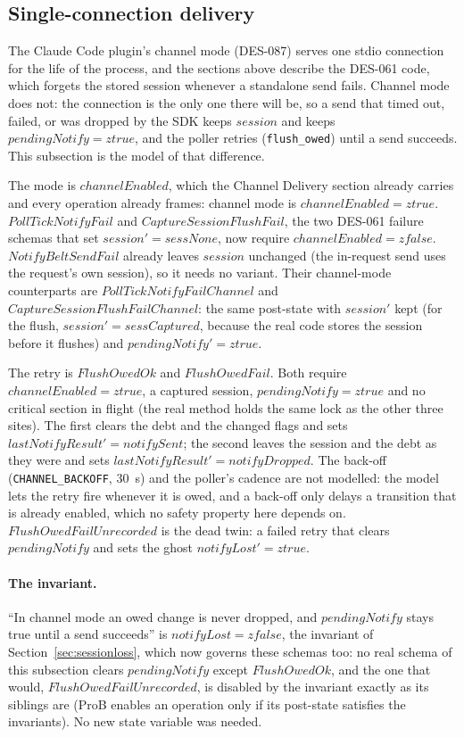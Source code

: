 \documentclass[a4paper,10pt,fleqn]{article}
\begin{document}
\subsection{Single-connection delivery}
\label{sec:singleconn}

The Claude Code plugin's channel mode (DES-087) serves one stdio connection
for the life of the process, and the sections above describe the DES-061 code,
which forgets the stored session whenever a standalone send fails.  Channel
mode does not: the connection is the only one there will be, so a send that
timed out, failed, or was dropped by the SDK keeps $session$ and keeps
$pendingNotify = ztrue$, and the poller retries (\texttt{flush\_owed}) until a
send succeeds.  This subsection is the model of that difference.

The mode is $channelEnabled$, which the Channel Delivery section already
carries and every operation already frames: channel mode is
$channelEnabled = ztrue$.  $PollTickNotifyFail$ and
$CaptureSessionFlushFail$, the two DES-061 failure schemas that set
$session' = sessNone$, now require $channelEnabled = zfalse$.
$NotifyBeltSendFail$ already leaves $session$ unchanged (the in-request send
uses the request's own session), so it needs no variant.  Their channel-mode
counterparts are $PollTickNotifyFailChannel$ and
$CaptureSessionFlushFailChannel$: the same post-state with $session'$ kept
(for the flush, $session' = sessCaptured$, because the real code stores the
session before it flushes) and $pendingNotify' = ztrue$.

The retry is $FlushOwedOk$ and $FlushOwedFail$.  Both require
$channelEnabled = ztrue$, a captured session, $pendingNotify = ztrue$ and no
critical section in flight (the real method holds the same lock as the other
three sites).  The first clears the debt and the changed flags and sets
$lastNotifyResult' = notifySent$; the second leaves the session and the debt
as they were and sets $lastNotifyResult' = notifyDropped$.  The back-off
(\texttt{CHANNEL\_BACKOFF}, 30~s) and the poller's cadence are not modelled:
the model lets the retry fire whenever it is owed, and a back-off only delays a
transition that is already enabled, which no safety property here depends on.
$FlushOwedFailUnrecorded$ is the dead twin: a failed retry that clears
$pendingNotify$ and sets the ghost $notifyLost' = ztrue$.

\paragraph{The invariant.}  ``In channel mode an owed change is never dropped,
and $pendingNotify$ stays true until a send succeeds'' is
$notifyLost = zfalse$, the invariant of Section~\ref{sec:sessionloss}, which
now governs these schemas too: no real schema of this subsection clears
$pendingNotify$ except $FlushOwedOk$, and the one that would,
$FlushOwedFailUnrecorded$, is disabled by the invariant exactly as its
siblings are (ProB enables an operation only if its post-state satisfies the
invariants).  No new state variable was needed.
\end{document}
